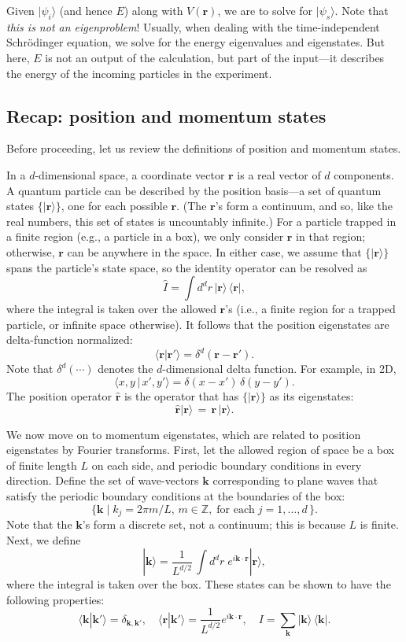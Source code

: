 \documentclass[pra,11pt]{revtex4}
\begin{document}
Given $|\psi_i\rangle$ (and hence $E$) along with $V(\mathbf{r})$, we
are to solve for $|\psi_s\rangle$.  Note that \textit{this is not an
  eigenproblem}!  Usually, when dealing with the time-independent
Schr\"odinger equation, we solve for the energy eigenvalues and
eigenstates.  But here, $E$ is not an output of the calculation, but
part of the input---it describes the energy of the incoming particles
in the experiment.

\subsection{Recap: position and momentum states}

Before proceeding, let us review the definitions of position and
momentum states.

In a $d$-dimensional space, a coordinate vector $\mathbf{r}$ is a real
vector of $d$ components.  A quantum particle can be described by the
position basis---a set of quantum states $\{|\mathbf{r}\rangle\}$, one
for each possible $\mathbf{r}$.  (The $\mathbf{r}$'s form a continuum,
and so, like the real numbers, this set of states is uncountably
infinite.)  For a particle trapped in a finite region (e.g., a
particle in a box), we only consider $\mathbf{r}$ in that region;
otherwise, $\mathbf{r}$ can be anywhere in the space.  In either case,
we assume that $\{|\mathbf{r}\rangle\}$ spans the particle's state
space, so the identity operator can be resolved as
$$\hat{I} = \int d^dr \, |\mathbf{r}\rangle \,\langle\mathbf{r}|,$$
where the integral is taken over the allowed $\mathbf{r}$'s (i.e., a
finite region for a trapped particle, or infinite space otherwise).
It follows that the position eigenstates are delta-function
normalized:
$$\langle \mathbf{r} | \mathbf{r}' \rangle = \delta^d(\mathbf{r}-\mathbf{r}').$$
Note that $\delta^d(\cdots)$ denotes the $d$-dimensional delta
function.  For example, in 2D,
$$\langle x,y \,|\, x',y' \rangle = \delta(x-x') \, \delta(y-y').$$
The position operator $\hat{\mathbf{r}}$ is the operator that has
$\{|\mathbf{r}\rangle\}$ as its eigenstates:
$$\hat{\mathbf{r}} |\mathbf{r}\rangle \,=\, \mathbf{r}\, |\mathbf{r}\rangle.$$

We now move on to momentum eigenstates, which are related to position
eigenstates by Fourier transforms.  First, let the allowed region of
space be a box of finite length $L$ on each side, and periodic boundary
conditions in every direction.  Define the set of wave-vectors
$\mathbf{k}$ corresponding to plane waves that satisfy the periodic
boundary conditions at the boundaries of the box:
$$\Big\{\mathbf{k}  \; \Big| \; k_j = 2\pi m/L, \,m\in\mathbb{Z}, \;\text{for each} \; j = 1, \dots,d\, \Big\}.$$
Note that the $\mathbf{k}$'s form a discrete set, not a continuum;
this is because $L$ is finite.  Next, we define
$$|\mathbf{k}\rangle = \frac{1}{L^{d/2}} \, \int d^dr \; e^{i\mathbf{k}\cdot\mathbf{r}} |\mathbf{r}\rangle,$$
where the integral is taken over the box.  These states
can be shown to have the following properties:
$$\langle\mathbf{k}|\mathbf{k}'\rangle = \delta_{\mathbf{k},\mathbf{k}'}, \quad \langle\mathbf{r}|\mathbf{k}'\rangle = \frac{1}{L^{d/2}} e^{i\mathbf{k}\cdot\mathbf{r}}, \quad I = \sum_{\mathbf{k}} |\mathbf{k}\rangle\,\langle\mathbf{k}|.$$
\end{document}

